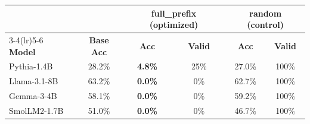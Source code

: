 \begin{tabular}{l c c c c c}
\toprule
 & & \multicolumn{2}{c}{\textbf{full\_prefix} (optimized)} & \multicolumn{2}{c}{\textbf{random} (control)} \\
\cmidrule(lr){3-4}\cmidrule(lr){5-6}
\textbf{Model} & \textbf{Base Acc} & \textbf{Acc} & \textbf{Valid} & \textbf{Acc} & \textbf{Valid} \\
\midrule
Pythia-1.4B  & 28.2\% & \textcolor{fullred}{\textbf{4.8\%}}  & 25\% & \textcolor{successgreen}{27.0\%} & 100\% \\
Llama-3.1-8B & 63.2\% & \textcolor{fullred}{\textbf{0.0\%}}  & 0\%  & \textcolor{successgreen}{62.7\%} & 100\% \\
Gemma-3-4B   & 58.1\% & \textcolor{fullred}{\textbf{0.0\%}}  & 0\%  & \textcolor{successgreen}{59.2\%} & 100\% \\
SmolLM2-1.7B & 51.0\% & \textcolor{fullred}{\textbf{0.0\%}}  & 0\%  & \textcolor{successgreen}{46.7\%} & 100\% \\
\bottomrule
\end{tabular}
